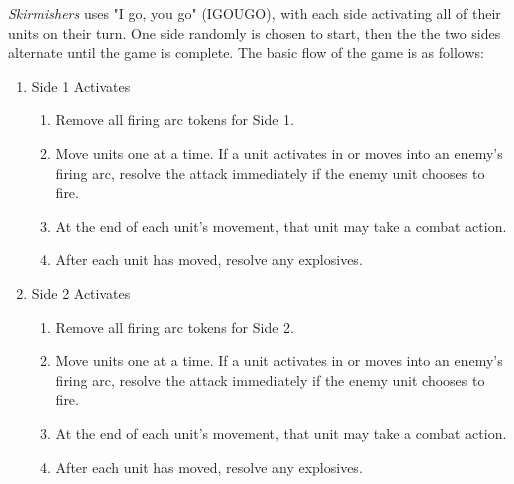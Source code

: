 \emph{Skirmishers} uses "I go, you go" (IGOUGO), with each side activating all of their units on their turn.
One side randomly is chosen to start, then the the two sides alternate until the game is complete.
The basic flow of the game is as follows:

\begin{enumerate}

  \item Side 1 Activates

  \begin{enumerate}

    \item Remove all firing arc tokens for Side 1.

    \item Move units one at a time.
       If a unit activates in or moves into an enemy's firing arc, resolve the attack immediately if the enemy unit chooses to fire.

    \item At the end of each unit's movement, that unit may take a combat action.

    \item After each unit has moved, resolve any explosives.

  \end{enumerate}

  \item Side 2 Activates

  \begin{enumerate}

    \item Remove all firing arc tokens for Side 2.

    \item Move units one at a time.
       If a unit activates in or moves into an enemy's firing arc, resolve the attack immediately if the enemy unit chooses to fire.

    \item At the end of each unit's movement, that unit may take a combat action.

    \item After each unit has moved, resolve any explosives.

  \end{enumerate}

\end{enumerate}
